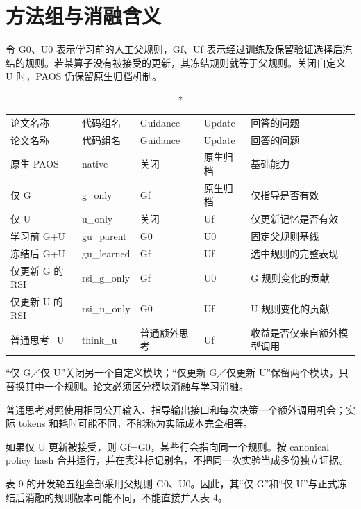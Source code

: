 \documentclass[UTF8,10pt,a4paper]{ctexart}
\begin{document}
\clearpage
\section*{方法组与消融含义}
令 G0、U0 表示学习前的人工父规则，Gf、Uf 表示经过训练及保留验证选择后冻结的规则。若某算子没有被接受的更新，其冻结规则就等于父规则。关闭自定义 U 时，PAOS 仍保留原生归档机制。
\begin{small}
\begin{longtable}{>{\raggedright\arraybackslash}p{3.40cm}>{\raggedright\arraybackslash}p{2.74cm}>{\raggedright\arraybackslash}p{1.75cm}>{\raggedright\arraybackslash}p{1.97cm}>{\raggedright\arraybackslash}p{5.26cm}}
\caption*{表 3 已登记的八个正式比较组}\\
\toprule
论文名称 & 代码组名 & Guidance & Update & 回答的问题\\\midrule
\endfirsthead
\toprule
论文名称 & 代码组名 & Guidance & Update & 回答的问题\\\midrule
\endhead
原生 PAOS & native & 关闭 & 原生归档 & 基础能力\\
仅 G & g\_only & Gf & 原生归档 & 仅指导是否有效\\
仅 U & u\_only & 关闭 & Uf & 仅更新记忆是否有效\\
学习前 G+U & gu\_parent & G0 & U0 & 固定父规则基线\\
冻结后 G+U & gu\_learned & Gf & Uf & 选中规则的完整表现\\
仅更新 G 的 RSI & rsi\_g\_only & Gf & U0 & G 规则变化的贡献\\
仅更新 U 的 RSI & rsi\_u\_only & G0 & Uf & U 规则变化的贡献\\
普通思考+U & think\_u & 普通额外思考 & Uf & 收益是否仅来自额外模型调用\\
\bottomrule
\end{longtable}
\end{small}
“仅 G／仅 U”关闭另一个自定义模块；“仅更新 G／仅更新 U”保留两个模块，只替换其中一个规则。论文必须区分模块消融与学习消融。

普通思考对照使用相同公开输入、指导输出接口和每次决策一个额外调用机会；实际 tokens 和耗时可能不同，不能称为实际成本完全相等。

如果仅 U 更新被接受，则 Gf=G0，某些行会指向同一个规则。按 canonical policy hash 合并运行，并在表注标记别名，不把同一次实验当成多份独立证据。

表 9 的开发轮五组全部采用父规则 G0、U0。因此，其“仅 G”和“仅 U”与正式冻结后消融的规则版本可能不同，不能直接并入表 4。

\clearpage
\end{document}
